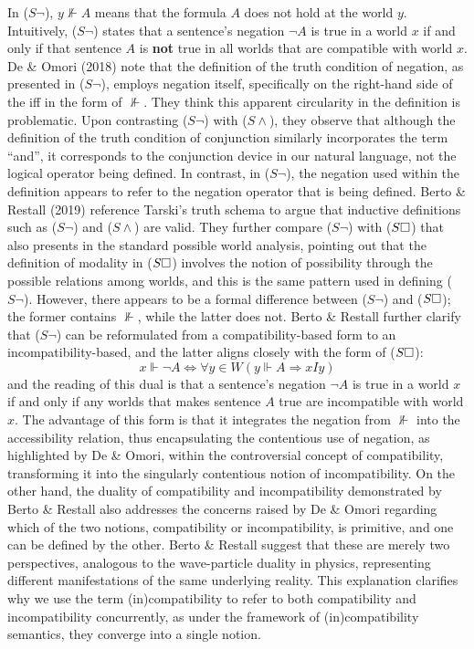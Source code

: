 In ($S\neg$), $y \not\Vdash A$ means that the formula $A$ does not hold at the world $y$. Intuitively, ($S\neg$) states that a sentence's negation $\neg A$ is true in a world $x$ if and only if that sentence $A$ is \textbf{not} true in all worlds that are compatible with world $x$. De \& Omori (2018) note that the definition of the truth condition of negation, as presented in ($S\neg$), employs negation itself, specifically on the right-hand side of the iff in the form of $\not\Vdash$. They think this apparent circularity in the definition is problematic. Upon contrasting ($S\neg$) with ($S\land$), they observe that although the definition of the truth condition of conjunction similarly incorporates the term ``and'', it corresponds to the conjunction device in our natural language, not the logical operator being defined. In contrast, in ($S\neg$), the negation used within the definition appears to refer to the negation operator that is being defined. Berto \& Restall (2019) reference Tarski's truth schema to argue that inductive definitions such as ($S\neg$) and ($S\land$) are valid. They further compare ($S\neg$) with ($S\Box$) that also presents in the standard possible world analysis, pointing out that the definition of modality in ($S\Box$) involves the notion of possibility through the possible relations among worlds, and this is the same pattern used in defining ($S\neg$). However, there appears to be a formal difference between ($S\neg$) and ($S\Box$); the former contains $\not\Vdash$, while the latter does not. Berto \& Restall further clarify that ($S\neg$) can be reformulated from a compatibility-based form to an incompatibility-based, and the latter aligns closely with the form of ($S\Box$):
\begin{equation}
    x \Vdash \neg A \iff \forall y \in W (y \Vdash A \Rightarrow xIy) \tag{$S^1\neg$}
\end{equation}
and the reading of this dual is that a sentence's negation $\neg A$ is true in a world $x$ if and only if any worlds that makes sentence $A$ true are incompatible with world $x$. The advantage of this form is that it integrates the negation from $\not\Vdash$ into the accessibility relation, thus encapsulating the contentious use of negation, as highlighted by De \& Omori, within the controversial concept of compatibility, transforming it into the singularly contentious notion of incompatibility. On the other hand, the duality of compatibility and incompatibility demonstrated by Berto \& Restall also addresses the concerns raised by De \& Omori regarding which of the two notions, compatibility or incompatibility, is primitive, and one can be defined by the other. Berto \& Restall suggest that these are merely two perspectives, analogous to the wave-particle duality in physics, representing different manifestations of the same underlying reality. This explanation clarifies why we use the term (in)compatibility to refer to both compatibility and incompatibility concurrently, as under the framework of (in)compatibility semantics, they converge into a single notion.


